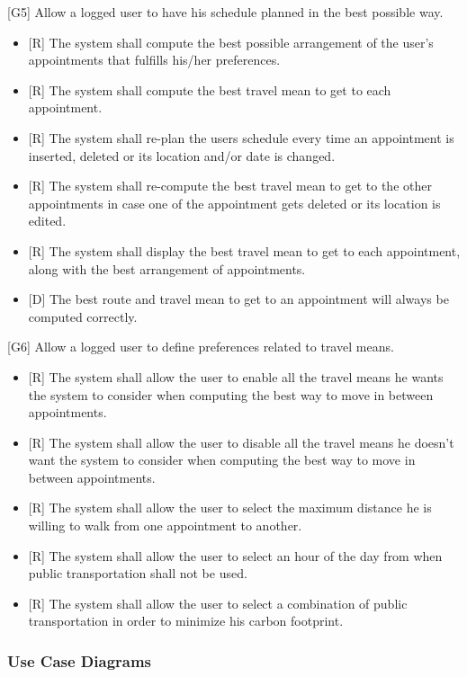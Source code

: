 \documentclass[12pt]{article}
\begin{document}
{[G5]} Allow a logged user to have his schedule planned in the best possible way.
\begin{itemize}
    \item{[R]} The system shall compute the best possible arrangement of the user's appointments that fulfills his/her preferences.
    \item{[R]} The system shall compute the best travel mean to get to each appointment.
    \item{[R]} The system shall re-plan the users schedule every time an appointment is inserted, deleted or its location and/or date is changed.
    \item{[R]} The system shall re-compute the best travel mean to get to the other appointments in case one of the appointment gets deleted or its location is edited.
    \item{[R]} The system shall display the best travel mean to get to each appointment, along with the best arrangement of appointments.
    \item{[D]} The best route and travel mean to get to an appointment will always be computed correctly.
    
\end{itemize}
{[G6]} Allow a logged user to define preferences related to travel means.
\begin{itemize}
    \item{[R]} The system shall allow the user to enable all the travel means he wants the system to consider when computing the best way to move in between appointments.
    \item{[R]} The system shall allow the user to disable all the travel means he doesn't want the system to consider when computing the best way to move in between appointments.
    \item{[R]} The system shall allow the user to select the maximum distance he is willing to walk from one appointment to another.
    \item{[R]} The system shall allow the user to select an hour of the day from when public transportation shall not be used.
    \item{[R]} The system shall allow the user to select a combination of public transportation in order to minimize his carbon footprint.
\end{itemize}

\newpage
\subsubsection{Use Case Diagrams}
\end{document}
